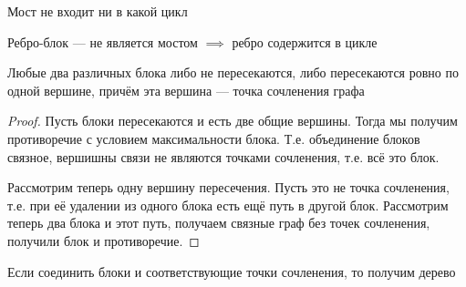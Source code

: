 \begin{remark}
	Мост не входит ни в какой цикл
\end{remark}

\begin{remark}
	Ребро-блок --- не является мостом $\implies$ ребро содержится в цикле
\end{remark}

\begin{remark}
	Любые два различных блока либо не пересекаются, либо пересекаются ровно по одной вершине, причём
	эта вершина --- точка сочленения графа
\end{remark}

\begin{proof}
	Пусть блоки пересекаются и есть две общие вершины. Тогда мы получим противоречие с условием максимальности
	блока. Т.е. объединение блоков связное, вершишны связи не являются точками сочленения, т.е. всё это блок.

	Рассмотрим теперь одну вершину пересечения. Пусть это не точка сочленения, т.е. при её удалении из одного
	блока есть ещё путь в другой блок. Рассмотрим теперь два блока и этот путь, получаем связные граф без
	точек сочленения, получили блок и противоречие.
\end{proof}

\begin{remark}
	Если соединить блоки и соответствующие точки сочленения, то получим дерево
\end{remark}

